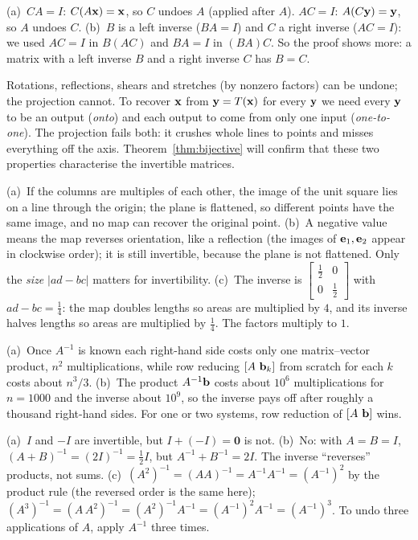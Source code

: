 \documentclass[11pt]{article}
\begin{document}
\begin{description}[leftmargin=0pt,itemsep=5pt]
  \item[Pause and think \ref{think:twoeq}.] (a)~$CA=I$: $C(A\mathbf{x})=\mathbf{x}$, so $C$ undoes $A$ (applied after $A$). $AC=I$: $A(C\mathbf{y})=\mathbf{y}$, so $A$ undoes $C$. (b)~$B$ is a left inverse ($BA=I$) and $C$ a right inverse ($AC=I$): we used $AC=I$ in $B(AC)$ and $BA=I$ in $(BA)C$. So the proof shows more: a matrix with a left inverse $B$ and a right inverse $C$ has $B=C$.
  \item[Pause and think \ref{think:whichundo}.] Rotations, reflections, shears and stretches (by nonzero factors) can be undone; the projection cannot. To recover $\mathbf{x}$ from $\mathbf{y}=T(\mathbf{x})$ for every $\mathbf{y}$ we need every $\mathbf{y}$ to be an output (\emph{onto}) and each output to come from only one input (\emph{one-to-one}). The projection fails both: it crushes whole lines to points and misses everything off the axis. Theorem~\ref{thm:bijective} will confirm that these two properties characterise the invertible matrices.
  \item[Pause and think \ref{think:whydet}.] (a)~If the columns are multiples of each other, the image of the unit square lies on a line through the origin; the plane is flattened, so different points have the same image, and no map can recover the original point. (b)~A negative value means the map reverses orientation, like a reflection (the images of $\mathbf{e}_1,\mathbf{e}_2$ appear in clockwise order); it is still invertible, because the plane is not flattened. Only the \emph{size} $|ad-bc|$ matters for invertibility. (c)~The inverse is $\begin{bmatrix}\tfrac12&0\\0&\tfrac12\end{bmatrix}$ with $ad-bc=\tfrac14$: the map doubles lengths so areas are multiplied by $4$, and its inverse halves lengths so areas are multiplied by $\tfrac14$. The factors multiply to $1$.
  \item[Pause and think \ref{think:manyb}.] (a)~Once $A^{-1}$ is known each right-hand side costs only one matrix--vector product, $n^2$ multiplications, while row reducing $[A\ \bv{b}_k]$ from scratch for each $k$ costs about $n^3/3$. (b)~The product $A^{-1}\mathbf{b}$ costs about $10^6$ multiplications for $n=1000$ and the inverse about $10^9$, so the inverse pays off after roughly a thousand right-hand sides. For one or two systems, row reduction of $[A\ \bv{b}]$ wins.
  \item[Pause and think \ref{think:sums}.] (a)~$I$ and $-I$ are invertible, but $I+(-I)=\mathbf{0}$ is not. (b)~No: with $A=B=I$, $(A+B)^{-1}=(2I)^{-1}=\tfrac12I$, but $A^{-1}+B^{-1}=2I$. The inverse ``reverses'' products, not sums. (c)~$(A^2)^{-1}=(AA)^{-1}=A^{-1}A^{-1}=(A^{-1})^2$ by the product rule (the reversed order is the same here); $(A^3)^{-1}=(A\,A^2)^{-1}=(A^2)^{-1}A^{-1}=(A^{-1})^2A^{-1}=(A^{-1})^3$. To undo three applications of $A$, apply $A^{-1}$ three times.

\end{description}
\end{document}
